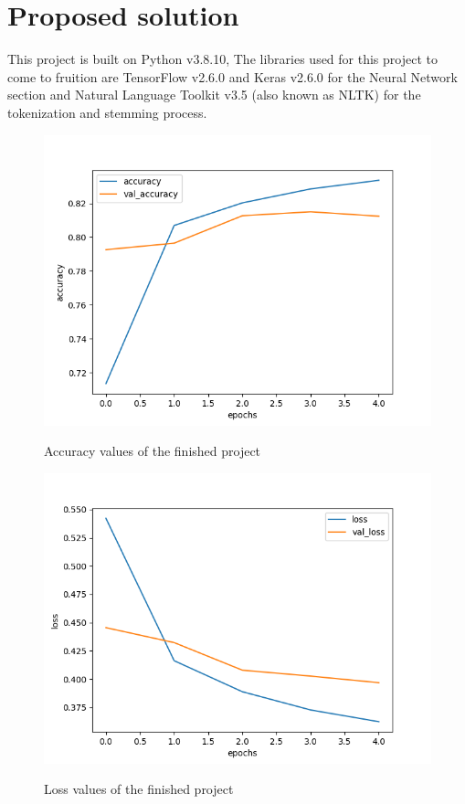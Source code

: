 \documentclass[review]{elsarticle} %
\begin{document}
\pagebreak

\section{Proposed solution}
This project is built on Python v3.8.10, The libraries used for this project to come to fruition are TensorFlow v2.6.0 and Keras v2.6.0 for the Neural Network section and Natural Language Toolkit v3.5 (also known as NLTK) for the tokenization and stemming process.
\begin{figure}[!h]
	\centering
	\includegraphics[scale=0.6]{Accuracy_Exp9}
	\label{fig:AccExp9}
	\caption{Accuracy values of the finished project}
\end{figure}
\begin{figure}[!h]
	\centering
	\includegraphics[scale=0.6]{Loss_Exp9}
	\label{fig:LossExp9}
	\caption{Loss values of the finished project}
\end{figure}
\pagebreak
\end{document}
